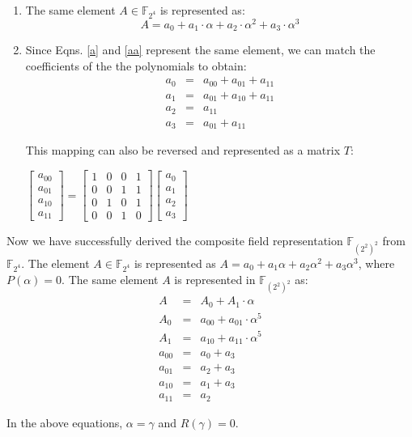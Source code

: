 \begin{Example}
\begin{enumerate}
\item The same element $A \in \mathbb{F}_{2^4}$ is represented as:
\begin{equation}\label{aa}
A=a_0+a_1\cdot \alpha+a_2\cdot \alpha^2+a_3\cdot \alpha^3 
\end{equation}

\item Since Eqns. \ref{a} and \ref{aa} represent the same element, we
  can match the coefficients of the the polynomials to obtain:
\begin{eqnarray}
a_0&=&a_{00}+a_{01}+a_{11} \nonumber \\
a_1&=&a_{01}+a_{10}+a_{11} \nonumber \\
a_2&=&a_{11} \nonumber \\
a_3&=&a_{01}+a_{11} \nonumber
\end{eqnarray}

This mapping can also be reversed and represented as a matrix $T$:
\begin{center}
$\begin{bmatrix} a_{00}\\ a_{01} \\a_{10} \\ a_{11}\end{bmatrix}
=
\begin{bmatrix} 1 & 0 & 0 & 1\\ 0 & 0 & 1 & 1\\ 0 & 1 & 0 & 1\\ 0 & 0
  & 1 & 0 \end{bmatrix} 
\begin{bmatrix} a_0\\ a_1 \\a_2 \\ a_3\end{bmatrix}$
\end{center}
\end{enumerate}

Now we have successfully derived the composite field representation
$\mathbb{F}_{(2^2)^2}$ from $\mathbb{F}_{2^4}$. The element $A \in \mathbb{F}_{2^4}$ is
represented as $A = a_0 + a_1 \alpha + a_2 \alpha^2 + a_3 \alpha^3$,
where $P(\alpha) = 0$. The same element $A$ is represented in $\mathbb{F}_{(2^2)^2}$ as:
\begin{eqnarray}
A&=&A_0+A_1 \cdot \alpha \nonumber \\
A_0&=&a_{00}+a_{01} \cdot \alpha^5 \nonumber \\
A_1&=&a_{10}+a_{11} \cdot \alpha^5 \nonumber \\
a_{00}&=&a_0+a_3 \nonumber \\
a_{01}&=&a_2+a_3 \nonumber \\
a_{10}&=&a_1+a_3 \nonumber \\
a_{11}&=&a_2 \nonumber 
\end{eqnarray}

In the above equations, $\alpha = \gamma$ and $R(\gamma) = 0$. 
\end{Example}

